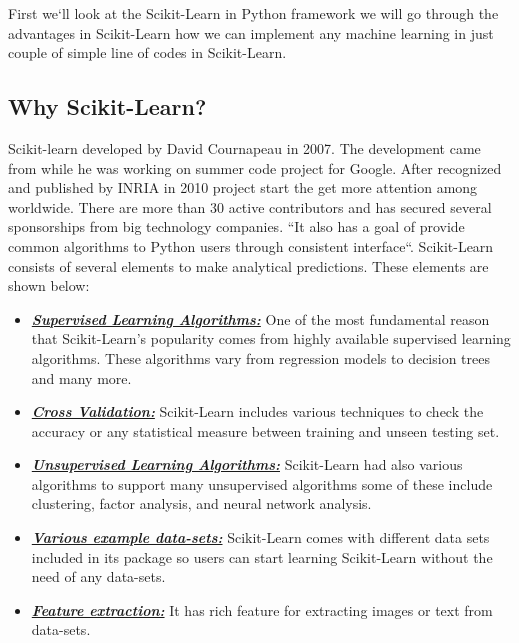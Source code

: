 \documentclass[sigconf]{acmart}
\begin{document}
\par First we`ll look at the Scikit-Learn in Python framework we will go through the advantages in Scikit-Learn how we can implement any machine learning in just couple of simple line of codes in Scikit-Learn. 

\subsection{Why Scikit-Learn?}
Scikit-learn developed by David Cournapeau in 2007. The development came from while he was working on summer code project for Google. After recognized and published by INRIA in 2010 project start the get more attention among worldwide. There are more than 30 active contributors and has secured several sponsorships from big technology companies\cite{www-machinelearningmystery}. ``It also has a goal of provide common algorithms to Python users through consistent interface\cite{www-oreily}``. Scikit-Learn consists of several elements to make analytical predictions. These elements are shown below\cite{www-analyticvidhya}:

\begin{itemize}
\item \textbf{\textit{\underline{Supervised Learning Algorithms:}}} One of the most fundamental reason that Scikit-Learn's popularity comes from highly available supervised learning algorithms. These algorithms vary from regression models to decision trees and many more\cite{www-analyticvidhya}. 
\item \textbf{\textit{\underline{Cross Validation:}}} Scikit-Learn includes various techniques to check the accuracy or any statistical measure between training and unseen testing set\cite{www-analyticvidhya}. 
\item \textbf{\textit{\underline{Unsupervised Learning Algorithms:}}} Scikit-Learn had also various algorithms to support many unsupervised algorithms some of these include clustering, factor analysis, and neural network analysis\cite{www-analyticvidhya}. 
\item \textbf{\textit{\underline{Various example data-sets:}}} Scikit-Learn comes with different data sets included in its package so users can start learning Scikit-Learn without the need of any data-sets\cite{www-analyticvidhya}. 
\item \textbf{\textit{\underline{Feature extraction:}}} It has rich feature for extracting images or text from data-sets\cite{www-analyticvidhya}.
\end{itemize}
\end{document}
